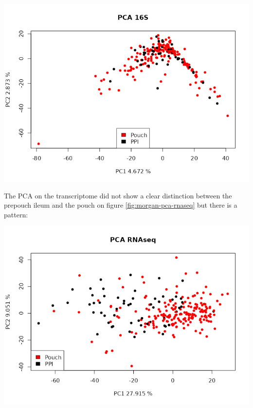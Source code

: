 \documentclass[
  12pt,
  a4paper,
  twoside,
  openright]{book}
\let\origfigure\figure
\let\endorigfigure\endfigure
\renewenvironment{figure}[1][2] {
    \expandafter\origfigure\expandafter[!ht]
} {
    \endorigfigure
}
\begin{document}
\begin{figure}
\includegraphics[width=1\linewidth]{images/morgan_pca_16S} \caption[PCA of 16S of Morgan's dataset]{PCA of 16S of Morgan's dataset. The sample are colored by location. }\label{fig:morgan-pca-16s}
\end{figure}

The PCA on the transcriptome did not show a clear distinction between the prepouch ileum and the pouch on figure \ref{fig:morgan-pca-rnaseq} but there is a pattern:

\begin{figure}
\includegraphics[width=1\linewidth]{images/morgan_pca_RNAseq} \caption[PCA of RNAseq of Morgan's dataset]{PCA of RNAseq of Morgan's dataset. The sample are colored by location. }\label{fig:morgan-pca-rnaseq}
\end{figure}
\end{document}
